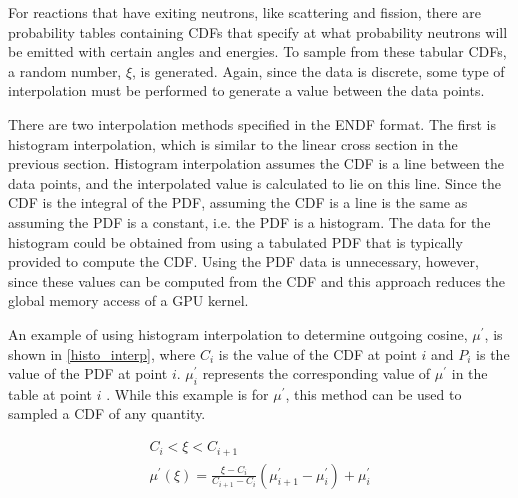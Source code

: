 For reactions that have exiting neutrons, like scattering and fission, there are probability tables containing CDFs that specify at what probability neutrons will be emitted with certain angles and energies.  To sample from these tabular CDFs, a random number, $\xi$, is generated.  Again, since the data is discrete, some type of interpolation must be performed to generate a value between the data points.  

There are two interpolation methods specified in the ENDF format.  The first is histogram interpolation, which is similar to the linear cross section in the previous section.  Histogram interpolation assumes the CDF is a line between the data points, and the interpolated value is calculated to lie on this line.  Since the CDF is the integral of the PDF, assuming the CDF is a line is the same as assuming the PDF is a constant, i.e. the PDF is a histogram.  The data for the histogram could be obtained from using a tabulated PDF that is typically provided to compute the CDF.  Using the PDF data is unnecessary, however, since these values can be computed from the CDF and this approach reduces the global memory access of a GPU kernel. 

An example of using histogram interpolation to determine outgoing cosine, $\mu^\prime$, is shown in \eqref{histo_interp}, where $C_{i}$ is the value of the CDF at point $i$ and $P_i$ is the value of the PDF at point $i$.  $\mu^\prime_i$ represents the corresponding value of $\mu^\prime$ in the table at point $i$ \cite{openmc}.
  While this example is for $\mu^\prime$, this method can be used to sampled a CDF of any quantity.

 \begin{equation}
\label{histo_interp}
\begin{gathered}
C_i < \xi < C_{i+1} \\
 \mu^\prime(\xi) = \frac{\xi-C_i}{C_{i+1}-C_i}(\mu^\prime_{i+1}-\mu^\prime_i) + \mu^\prime_i
\end{gathered}
\end{equation}

